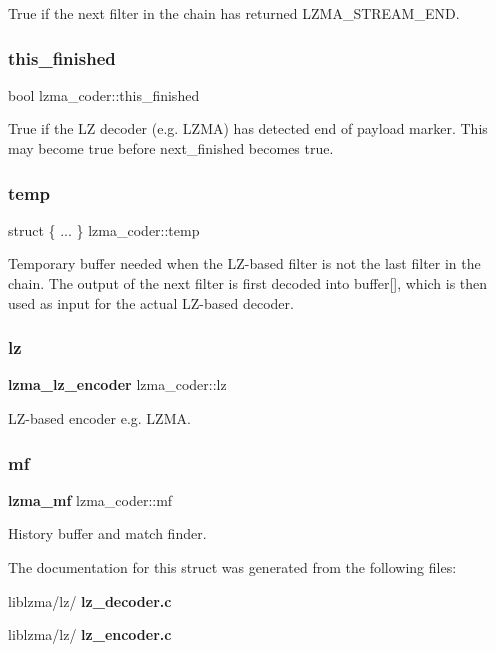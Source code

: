 True if the next filter in the chain has returned L\+Z\+M\+A\+\_\+\+S\+T\+R\+E\+A\+M\+\_\+\+E\+ND. 

\mbox{\label{structlzma__coder_acecb640812c1a9f9d023a7f73f3c1485}} 
\subsubsection{this\+\_\+finished}
{\footnotesize\ttfamily bool lzma\+\_\+coder\+::this\+\_\+finished}

True if the LZ decoder (e.\+g. L\+Z\+MA) has detected end of payload marker. This may become true before next\+\_\+finished becomes true. \mbox{\label{structlzma__coder_a866db081456f41500e0a03dd99c77435}} 
\subsubsection{temp}
{\footnotesize\ttfamily struct \{ ... \}   lzma\+\_\+coder\+::temp}

Temporary buffer needed when the L\+Z-\/based filter is not the last filter in the chain. The output of the next filter is first decoded into buffer[], which is then used as input for the actual L\+Z-\/based decoder. \mbox{\label{structlzma__coder_a0bcea5c6c214f795a18bdb10075bb8be}} 
\subsubsection{lz\hspace{0.1cm}{\footnotesize\ttfamily [2/2]}}
{\footnotesize\ttfamily \textbf{ lzma\+\_\+lz\+\_\+encoder} lzma\+\_\+coder\+::lz}



L\+Z-\/based encoder e.\+g. L\+Z\+MA. 

\mbox{\label{structlzma__coder_ac9d2352827afedf9e66ece02a9113a04}} 
\subsubsection{mf}
{\footnotesize\ttfamily \textbf{ lzma\+\_\+mf} lzma\+\_\+coder\+::mf}



History buffer and match finder. 



The documentation for this struct was generated from the following files\+:\begin{DoxyCompactItemize}
\item 
liblzma/lz/\textbf{ lz\+\_\+decoder.\+c}\item 
liblzma/lz/\textbf{ lz\+\_\+encoder.\+c}\end{DoxyCompactItemize}
